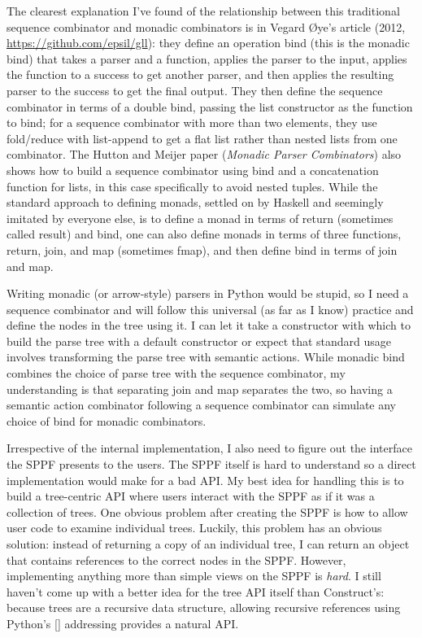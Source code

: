 \documentclass[12pt]{article}
\begin{document}
The clearest explanation I've found of the relationship between this
traditional sequence combinator and monadic combinators is in Vegard
\O ye's article (2012, \url{https://github.com/epsil/gll}): they
define an operation bind (this is the monadic bind) that takes a
parser and a function, applies the parser to the input, applies the
function to a success to get another parser, and then applies the
resulting parser to the success to get the final output.  They then
define the sequence combinator in terms of a double bind, passing the
list constructor as the function to bind; for a sequence combinator
with more than two elements, they use fold/reduce with list-append to
get a flat list rather than nested lists from one combinator.  The
Hutton and Meijer paper (\emph{Monadic Parser Combinators}) also shows
how to build a sequence combinator using bind and a concatenation
function for lists, in this case specifically to avoid nested tuples.
While the standard approach to defining monads, settled on by Haskell
and seemingly imitated by everyone else, is to define a monad in terms
of return (sometimes called result) and bind, one can also define
monads in terms of three functions, return, join, and map (sometimes
fmap), and then define bind in terms of join and map.

Writing monadic (or arrow-style) parsers in Python would be stupid, so
I need a sequence combinator and will follow this universal (as far as
I know) practice and define the nodes in the tree using it.  I can let
it take a constructor with which to build the parse tree with a
default constructor or expect that standard usage involves
transforming the parse tree with semantic actions.  While monadic bind
combines the choice of parse tree with the sequence combinator, my
understanding is that separating join and map separates the two, so
having a semantic action combinator following a sequence combinator
can simulate any choice of bind for monadic combinators.

Irrespective of the internal implementation, I also need to figure out
the interface the SPPF presents to the users.  The SPPF itself is hard
to understand so a direct implementation would make for a bad API.  My
best idea for handling this is to build a tree-centric API where users
interact with the SPPF as if it was a collection of trees.  One
obvious problem after creating the SPPF is how to allow user code to
examine individual trees.  Luckily, this problem has an obvious
solution: instead of returning a copy of an individual tree, I can
return an object that contains references to the correct nodes in the
SPPF.  However, implementing anything more than simple views on the
SPPF is \emph{hard}.  I still haven't come up with a better idea for
the tree API itself than Construct's: because trees are a recursive
data structure, allowing recursive references using Python's []
addressing provides a natural API.
\end{document}
